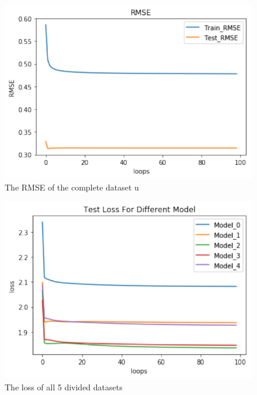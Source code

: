 \documentclass[journal, a4paper]{IEEEtran}
\begin{document}
\begin{figure}[!hbt]
		\begin{center}
		\includegraphics[width=\columnwidth]{lab4-loss-RMSE}
		\caption{The RMSE of the complete dataset u}
		\label{fig:tf_plot}
		\end{center}
\end{figure}

\begin{figure}[!hbt]
		\begin{center}
		\includegraphics[width=\columnwidth]{lab4-all-loss}
		\caption{The loss of all 5 divided datasets}
		\label{fig:tf_plot}
		\end{center}
\end{figure}
\end{document}

